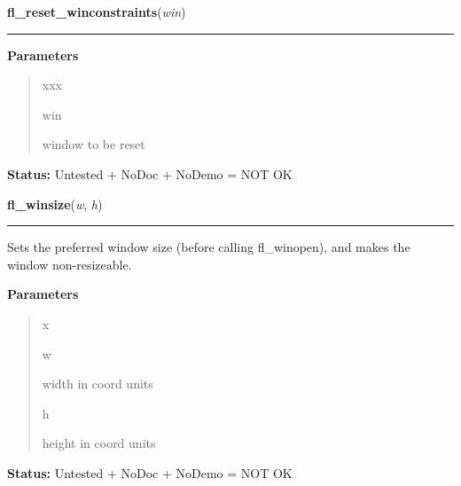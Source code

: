 \hspace{.8\funcindent}\begin{boxedminipage}{\funcwidth}

    \raggedright \textbf{fl\_reset\_winconstraints}(\textit{win})

    \vspace{-1.5ex}

    \rule{\textwidth}{0.5\fboxrule}
\setlength{\parskip}{2ex}
\setlength{\parskip}{1ex}
      \textbf{Parameters}
      \vspace{-1ex}

      \begin{quote}
        \begin{Ventry}{xxx}

          \item[win]

          window to be reset

        \end{Ventry}

      \end{quote}

\textbf{Status:} Untested + NoDoc + NoDemo = NOT OK



    \end{boxedminipage}

    \label{xformslib:library:fl_winsize}

    \vspace{0.5ex}

\hspace{.8\funcindent}\begin{boxedminipage}{\funcwidth}

    \raggedright \textbf{fl\_winsize}(\textit{w}, \textit{h})

    \vspace{-1.5ex}

    \rule{\textwidth}{0.5\fboxrule}
\setlength{\parskip}{2ex}
    Sets the preferred window size (before calling fl\_winopen), and makes 
    the window non-resizeable.

\setlength{\parskip}{1ex}
      \textbf{Parameters}
      \vspace{-1ex}

      \begin{quote}
        \begin{Ventry}{x}

          \item[w]

          width in coord units

          \item[h]

          height in coord units

        \end{Ventry}

      \end{quote}

\textbf{Status:} Untested + NoDoc + NoDemo = NOT OK



    \end{boxedminipage}

